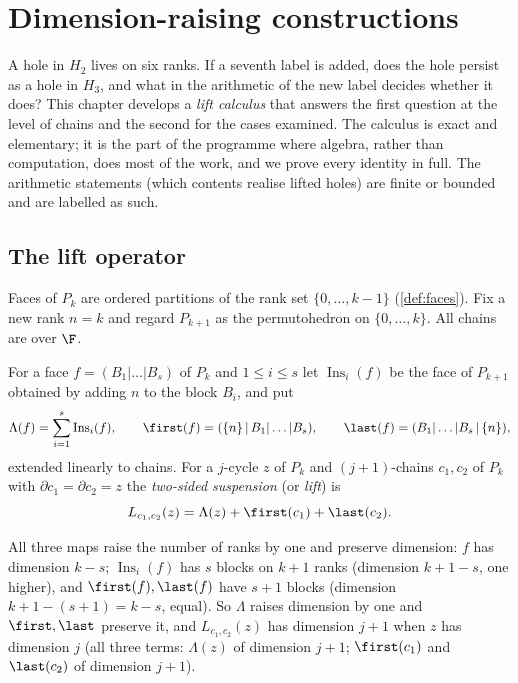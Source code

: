 \chapter{Dimension-raising constructions}\label{ch:dimension}

A hole in $H_2$ lives on six ranks. If a seventh label is added, does the hole persist as a hole in $H_3$, and what in the arithmetic of the new label decides whether it does? This chapter develops a \emph{lift calculus} that answers the first question at the level of chains and the second for the cases examined. The calculus is exact and elementary; it is the part of the programme where algebra, rather than computation, does most of the work, and we prove every identity in full. The arithmetic statements (which contents realise lifted holes) are finite or bounded and are labelled as such.

\section{The lift operator}\label{sec:lift}
Faces of $P_k$ are ordered partitions of the rank set $\{0,\dots,k-1\}$ (\cref{def:faces}). Fix a new rank $n=k$ and regard $P_{k+1}$ as the permutohedron on $\{0,\dots,k\}$. All chains are over $\F$.
\begin{definition}\label{def:lift}
For a face $f=(B_1|\dots|B_s)$ of $P_k$ and $1\le i\le s$ let $\operatorname{Ins}_i(f)$ be the face of $P_{k+1}$ obtained by adding $n$ to the block $B_i$, and put
\[
\Lambda(f)=\sum_{i=1}^s\operatorname{Ins}_i(f),\qquad \first(f)=(\{n\}\,|\,B_1|\dots|B_s),\qquad \last(f)=(B_1|\dots|B_s\,|\,\{n\}),
\]
extended linearly to chains. For a $j$-cycle $z$ of $P_k$ and $(j{+}1)$-chains $c_1,c_2$ of $P_k$ with $\partial c_1=\partial c_2=z$ the \emph{two-sided suspension} (or \emph{lift}) is
\[
L_{c_1,c_2}(z)=\Lambda(z)+\first(c_1)+\last(c_2).
\]
\end{definition}
All three maps raise the number of ranks by one and preserve dimension: $f$ has dimension $k-s$; $\operatorname{Ins}_i(f)$ has $s$ blocks on $k{+}1$ ranks (dimension $k{+}1-s$, one higher), and $\first(f),\last(f)$ have $s{+}1$ blocks (dimension $k{+}1-(s{+}1)=k-s$, equal). So $\Lambda$ raises dimension by one and $\first,\last$ preserve it, and $L_{c_1,c_2}(z)$ has dimension $j{+}1$ when $z$ has dimension $j$ (all three terms: $\Lambda(z)$ of dimension $j{+}1$; $\first(c_1)$ and $\last(c_2)$ of dimension $j{+}1$).

